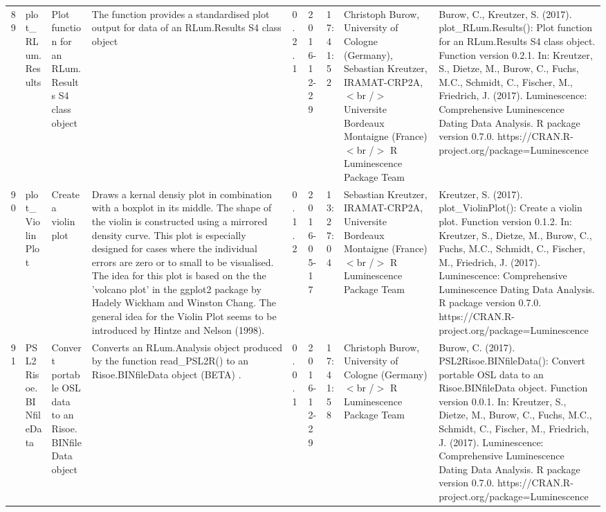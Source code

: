 \begin{table}[ht]
\begin{tabular}{rllllllll}
 \\ 
  89 & plot\_RLum.Results & Plot function for an RLum.Results S4 class object & The function provides a standardised plot output for data of an RLum.Results S4 class object & 0.2.1 & 2016-12-29 & 17:41:52
 & Christoph Burow, University of Cologne (Germany), Sebastian Kreutzer, IRAMAT-CRP2A,$<$br /$>$ Universite Bordeaux Montaigne (France)$<$br /$>$  R Luminescence Package Team & Burow, C., Kreutzer, S. (2017). plot\_RLum.Results(): Plot function for an RLum.Results S4 class object. Function version 0.2.1. In: Kreutzer, S., Dietze, M., Burow, C., Fuchs, M.C., Schmidt, C., Fischer, M., Friedrich, J. (2017). Luminescence: Comprehensive Luminescence Dating Data Analysis. R package version 0.7.0. https://CRAN.R-project.org/package=Luminescence
 \\ 
  90 & plot\_ViolinPlot & Create a violin plot & Draws a kernal densiy plot in combination with a boxplot in its middle. The shape of the violin is constructed using a mirrored density curve. This plot is especially designed for cases where the individual errors are zero or to small to be visualised. The idea for this plot is based on the the 'volcano plot' in the ggplot2 package by Hadely Wickham and Winston Chang. The general idea for the Violin Plot seems to be introduced by Hintze and Nelson (1998). & 0.1.2 & 2016-05-17 & 13:27:04
 & Sebastian Kreutzer, IRAMAT-CRP2A, Universite Bordeaux Montaigne (France)$<$br /$>$  R Luminescence Package Team & Kreutzer, S. (2017). plot\_ViolinPlot(): Create a violin plot. Function version 0.1.2. In: Kreutzer, S., Dietze, M., Burow, C., Fuchs, M.C., Schmidt, C., Fischer, M., Friedrich, J. (2017). Luminescence: Comprehensive Luminescence Dating Data Analysis. R package version 0.7.0. https://CRAN.R-project.org/package=Luminescence
 \\ 
  91 & PSL2Risoe.BINfileData & Convert portable OSL data to an Risoe.BINfileData object & Converts an  RLum.Analysis  object produced by the function  read\_PSL2R()  to an  Risoe.BINfileData  object  (BETA) . & 0.0.1 & 2016-12-29 & 17:41:58
 & Christoph Burow, University of Cologne (Germany)$<$br /$>$  R Luminescence Package Team & Burow, C. (2017). PSL2Risoe.BINfileData(): Convert portable OSL data to an Risoe.BINfileData object. Function version 0.0.1. In: Kreutzer, S., Dietze, M., Burow, C., Fuchs, M.C., Schmidt, C., Fischer, M., Friedrich, J. (2017). Luminescence: Comprehensive Luminescence Dating Data Analysis. R package version 0.7.0. https://CRAN.R-project.org/package=Luminescence
 \\ 

\end{tabular}
\end{table}
